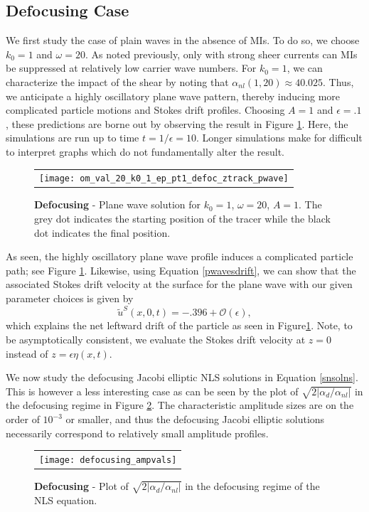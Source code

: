 \documentclass[a4paper,11pt]{article}
\begin{document}
\subsection{Defocusing Case}
We first study the case of plain waves in the absence of MIs.  To do so, we choose $k_{0}=1$ and $\omega=20$.  As noted previously, only with strong sheer currents can MIs be suppressed at relatively low carrier wave numbers.  For $k_{0}=1$, we can characterize the impact of the shear by noting that $\alpha_{nl}(1,20)\approx40.025$.  Thus, we anticipate a highly oscillatory plane wave pattern, thereby inducing more complicated particle motions and Stokes drift profiles.  Choosing $A=1$ and $\epsilon=.1$, these predictions are borne out by observing the result in Figure \ref{fig:defoc_pwave}.  Here, the simulations are run up to time $t=1/\epsilon = 10$.  Longer simulations make for difficult to interpret graphs which do not fundamentally alter the result.  
\begin{figure}
\centering
\begin{tabular}{c}
\texttt{[image: om\_val\_20\_k0\_1\_ep\_pt1\_defoc\_ztrack\_pwave]} 
\end{tabular}
\caption{{\bf Defocusing} - Plane wave solution for $k_{0}=1$, $\omega=20$, $A=1$.  The grey dot indicates the starting position of the tracer while the black dot indicates the final position.}
\label{fig:defoc_pwave}
\end{figure}
As seen, the highly oscillatory plane wave profile induces a complicated particle path; see Figure \ref{fig:defoc_pwave}.  Likewise, using Equation \eqref{pwavesdrift}, we can show that the associated Stokes drift velocity at the surface for the plane wave with our given parameter choices is given by 
\[
\tilde{u}^{S}(x,0,t) = -.396  + \mathcal{O}(\epsilon),
\]
which explains the net leftward drift of the particle as seen in Figure\ref{fig:defoc_pwave}. Note, to be asymptotically consistent, we evaluate the Stokes drift velocity at $z=0$ instead of $z=\epsilon \eta(x,t)$.

We now study the defocusing Jacobi elliptic NLS solutions in Equation \eqref{snsolns}.  This is however a less interesting case as can be seen by the plot of $\sqrt{2|\alpha_{d}/\alpha_{nl}|}$ in the defocusing regime in Figure \ref{fig:defoc_amp}.  The characteristic amplitude sizes are on the order of $10^{-3}$ or smaller, and thus the defocusing Jacobi elliptic solutions necessarily correspond to relatively small amplitude profiles.  
\begin{figure}
\centering
\begin{tabular}{c}
\texttt{[image: defocusing\_ampvals]} 
\end{tabular}
\caption{{\bf Defocusing} - Plot of $\sqrt{2|\alpha_{d}/\alpha_{nl}|}$ in the defocusing regime of the NLS equation.}
\label{fig:defoc_amp}
\end{figure}
\end{document}
